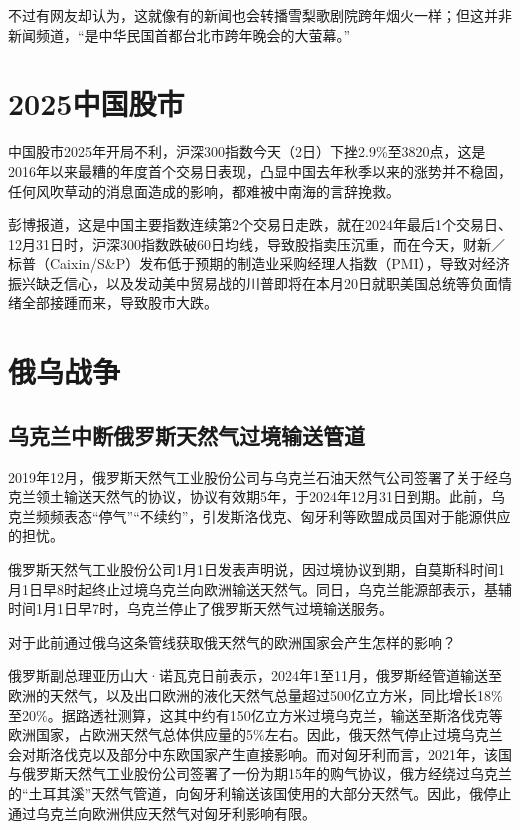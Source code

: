不过有网友却认为，这就像有的新闻也会转播雪梨歌剧院跨年烟火一样；但这并非新闻频道，“是中华民国首都台北市跨年晚会的大萤幕。”

\section{2025中国股市}

中国股市2025年开局不利，沪深300指数今天（2日）下挫2.9\%至3820点，这是2016年以来最糟的年度首个交易日表现，凸显中国去年秋季以来的涨势并不稳固，任何风吹草动的消息面造成的影响，都难被中南海的言辞挽救。

彭博报道，这是中国主要指数连续第2个交易日走跌，就在2024年最后1个交易日、12月31日时，沪深300指数跌破60日均线，导致股指卖压沉重，而在今天，财新／标普（Caixin/S\&P）发布低于预期的制造业采购经理人指数（PMI），导致对经济振兴缺乏信心，以及发动美中贸易战的川普即将在本月20日就职美国总统等负面情绪全部接踵而来，导致股市大跌。

\section{俄乌战争}

\subsection{乌克兰中断俄罗斯天然气过境输送管道}

2019年12月，俄罗斯天然气工业股份公司与乌克兰石油天然气公司签署了关于经乌克兰领土输送天然气的协议，协议有效期5年，于2024年12月31日到期。此前，乌克兰频频表态“停气”“不续约”，引发斯洛伐克、匈牙利等欧盟成员国对于能源供应的担忧。

俄罗斯天然气工业股份公司1月1日发表声明说，因过境协议到期，自莫斯科时间1月1日早8时起终止过境乌克兰向欧洲输送天然气。同日，乌克兰能源部表示，基辅时间1月1日早7时，乌克兰停止了俄罗斯天然气过境输送服务。

对于此前通过俄乌这条管线获取俄天然气的欧洲国家会产生怎样的影响？

俄罗斯副总理亚历山大·诺瓦克日前表示，2024年1至11月，俄罗斯经管道输送至欧洲的天然气，以及出口欧洲的液化天然气总量超过500亿立方米，同比增长18\%至20\%。据路透社测算，这其中约有150亿立方米过境乌克兰，输送至斯洛伐克等欧洲国家，占欧洲天然气总体供应量的5\%左右。因此，俄天然气停止过境乌克兰会对斯洛伐克以及部分中东欧国家产生直接影响。而对匈牙利而言，2021年，该国与俄罗斯天然气工业股份公司签署了一份为期15年的购气协议，俄方经绕过乌克兰的“土耳其溪”天然气管道，向匈牙利输送该国使用的大部分天然气。因此，俄停止通过乌克兰向欧洲供应天然气对匈牙利影响有限。

